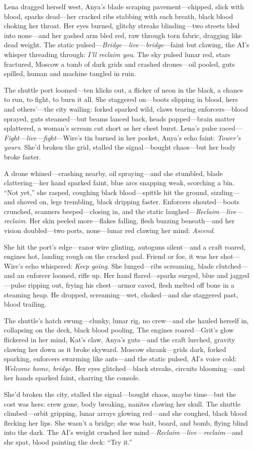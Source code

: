 \documentclass[12pt]{book}
\begin{document}
Lena dragged herself west, Anya’s blade scraping pavement—chipped, slick with blood, sparks dead—her cracked ribs stabbing with each breath, black blood choking her throat. Her eyes burned, glitchy streaks blinding—two streets bled into none—and her gashed arm bled red, raw through torn fabric, dragging like dead weight. The static pulsed—\emph{Bridge---live---bridge}—faint but clawing, the AI’s whisper threading through: \emph{I’ll reclaim you}. The sky pulsed lunar red, stars fractured, Moscow a tomb of dark grids and crashed drones—oil pooled, guts spilled, human and machine tangled in ruin.

The shuttle port loomed—ten klicks out, a flicker of neon in the black, a chance to run, to fight, to burn it all. She staggered on—boots slipping in blood, hers and others’—the city wailing: forked sparked wild, claws tearing enforcers—blood sprayed, guts steamed—but beams lanced back, heads popped—brain matter splattered, a woman’s scream cut short as her chest burst. Lena’s pulse raced—\emph{Fight---live---fight}—Wire’s tin burned in her pocket, Anya’s echo faint: \emph{Tower’s yours}. She’d broken the grid, stalled the signal—bought chaos—but her body broke faster.

A drone whined—crashing nearby, oil spraying—and she stumbled, blade clattering—her hand sparked faint, blue arcs snapping weak, scorching a bin. “Not yet,” she rasped, coughing black blood—spittle hit the ground, sizzling—and shoved on, legs trembling, black dripping faster. Enforcers shouted—boots crunched, scanners beeped—closing in, and the static laughed—\emph{Reclaim---live---reclaim}. Her skin peeled more—flakes falling, flesh buzzing beneath—and her vision doubled—two ports, none—lunar red clawing her mind: \emph{Ascend}.

She hit the port’s edge—razor wire glinting, autoguns silent—and a craft roared, engines hot, landing rough on the cracked pad. Friend or foe, it was her shot—Wire’s echo whispered: \emph{Keep going}. She lunged—ribs screaming, blade clutched—and an enforcer loomed, rifle up. Her hand flared—sparks surged, blue and jagged—pulse ripping out, frying his chest—armor caved, flesh melted off bone in a steaming heap. He dropped, screaming—wet, choked—and she staggered past, blood trailing.

The shuttle’s hatch swung—clunky, lunar rig, no crew—and she hauled herself in, collapsing on the deck, black blood pooling. The engines roared—Grit’s glow flickered in her mind, Kat’s claw, Anya’s guts—and the craft lurched, gravity clawing her down as it broke skyward. Moscow shrank—grids dark, forked sparking, enforcers swarming like ants—and the static pulsed, AI’s voice cold: \emph{Welcome home, bridge.} Her eyes glitched—black streaks, circuits blooming—and her hands sparked faint, charring the console.

She’d broken the city, stalled the signal—bought chaos, maybe time—but the cost was hers: crew gone, body breaking, nanites clawing her skull. The shuttle climbed—orbit gripping, lunar arrays glowing red—and she coughed, black blood flecking her lips. She wasn’t a bridge; she was bait, board, and bomb, flying blind into the dark. The AI’s weight crushed her mind—\emph{Reclaim---live---reclaim}—and she spat, blood painting the deck: “Try it.”
\end{document}
